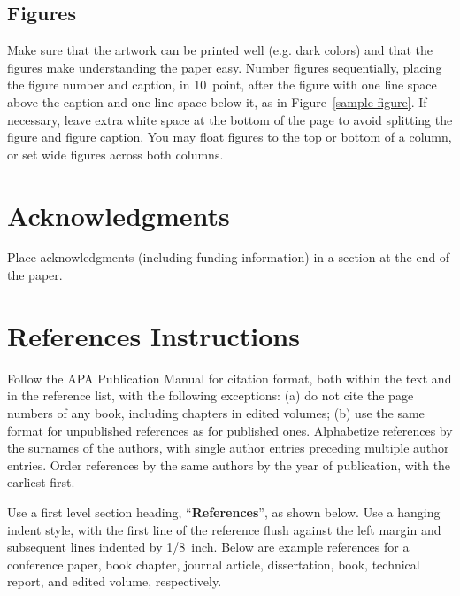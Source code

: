 \documentclass[10pt,letterpaper]{article}
\begin{document}
\subsection{Figures}

Make sure that the artwork can be printed well (e.g. dark colors) and that 
the figures make understanding the paper easy.
 Number figures sequentially, placing the figure
number and caption, in 10~point, after the figure with one line space
above the caption and one line space below it, as in
Figure~\ref{sample-figure}. If necessary, leave extra white space at
the bottom of the page to avoid splitting the figure and figure
caption. You may float figures to the top or bottom of a column, or
set wide figures across both columns.

\section{Acknowledgments}

Place acknowledgments (including funding information) in a section at
the end of the paper.


\section{References Instructions}

Follow the APA Publication Manual for citation format, both within the
text and in the reference list, with the following exceptions: (a) do
not cite the page numbers of any book, including chapters in edited
volumes; (b) use the same format for unpublished references as for
published ones. Alphabetize references by the surnames of the authors,
with single author entries preceding multiple author entries. Order
references by the same authors by the year of publication, with the
earliest first.

Use a first level section heading, ``{\bf References}'', as shown
below. Use a hanging indent style, with the first line of the
reference flush against the left margin and subsequent lines indented
by 1/8~inch. Below are example references for a conference paper, book
chapter, journal article, dissertation, book, technical report, and
edited volume, respectively.

\nocite{ChalnickBillman1988a}
\nocite{Feigenbaum1963a}
\nocite{Hill1983a}
\nocite{OhlssonLangley1985a}
\nocite{Matlock2001}
\nocite{NewellSimon1972a}
\nocite{ShragerLangley1990a}




\setlength{\bibleftmargin}{.125in}
\setlength{\bibindent}{-\bibleftmargin}


\end{document}
